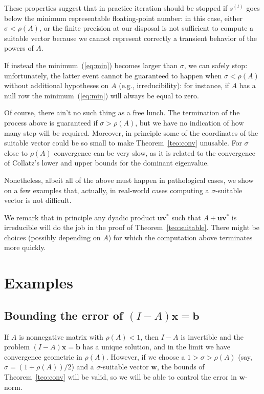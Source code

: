 \documentclass{article}
\newcommand{\w}{{\bm w}}
\newcommand{\1}{\mathbf 1}
\begin{document}
These properties suggest that in practice iteration should be stopped if
$s^{(t)}$ goes below the minimum representable floating-point number: in this case, either
$\sigma<\rho(A)$, or the finite precision at our disposal is not sufficient to
compute a suitable vector because we cannot represent correctly a transient
behavior of the powers of $A$.

If instead the minimum~(\ref{eq:min}) becomes larger than $\sigma$, we can
safely stop: unfortunately, the latter event cannot be guaranteed to happen when
$\sigma<\rho(A)$ without additional hypotheses on $A$ (e.g., irreducibility):
for instance, if $A$ has a null row the minimum~(\ref{eq:min}) will always be equal to zero.



Of course, there ain't no such thing as a free lunch. The termination
of the process above is guaranteed if $\sigma>\rho(A)$, but we have no indication of how many step will be
required. Moreover, in principle some of the coordinates of the suitable vector could be so small 
to make Theorem~\ref{teo:conv}
unusable. For $\sigma$ close to $\rho(A)$
convergence can be very slow, as it is related to the convergence of Collatz's
lower and upper bounds for the dominant eigenvalue.

Nonetheless, albeit all of the above must happen in pathological cases, we show on
a few examples that, actually, in real-world cases computing a $\sigma$-suitable
vector is not difficult.

We remark that in principle any dyadic product $\bm u\bm v^*$ such that $A+\bm u
\bm v^*$ is irreducible will do the job in the proof of
Theorem~\ref{teo:suitable}. There might be choices (possibly depending on
$A$) for which the computation above terminates more quickly.

\section{Examples}

\subsection{Bounding the error of $(I-A)\bm x=\bm b$}

If $A$ is nonnegative matrix with $\rho(A)<1$, then $I-A$ is invertible and the 
problem $(I-A)\bm x=\bm b$ has a unique solution, and in the limit we have
convergence geometric in $\rho(A)$. However, if we choose a
$1>\sigma>\rho(A)$ (say, $\sigma=(1+\rho(A))/2$) and a $\sigma$-suitable vector $\w$, the bounds of
Theorem~\ref{teo:conv} will be valid, so we will be
able to control the error in $\w$-norm.
\end{document}
